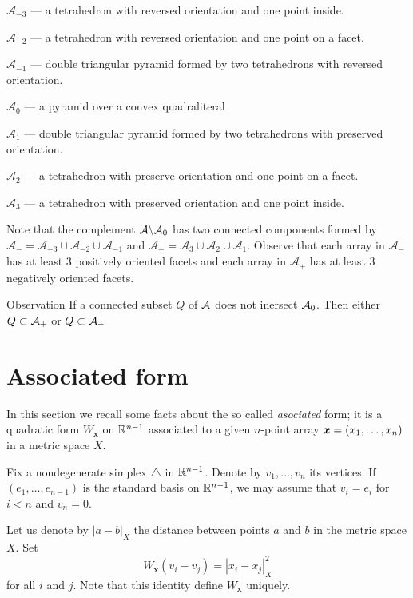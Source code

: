 \documentclass{article}
\begin{document}
$\mathcal{A}_{-3}$ --- a tetrahedron with reversed orientation and one point inside.

$\mathcal{A}_{-2}$ --- a tetrahedron with reversed orientation and one point on a facet.

$\mathcal{A}_{-1}$ --- double triangular pyramid formed by two tetrahedrons with reversed orientation.

$\mathcal{A}_{0}$ --- a pyramid over a convex quadraliteral 

$\mathcal{A}_{1}$ --- double triangular pyramid formed by two tetrahedrons with preserved orientation.

$\mathcal{A}_{2}$ --- a tetrahedron with preserve orientation and one point on a facet.

$\mathcal{A}_{3}$ --- a tetrahedron with preserved orientation and one point inside.

Note that the complement $\mathcal{A}\backslash \mathcal{A}_0$ has two connected components formed by $\mathcal{A}_{-}=\mathcal{A}_{-3}\cup \mathcal{A}_{-2}\cup\mathcal{A}_{-1}$ and $\mathcal{A}_{+}=\mathcal{A}_{3}\cup \mathcal{A}_{2}\cup\mathcal{A}_{1}$.
Observe that each array in $\mathcal{A}_{-}$ has at least 3 positively oriented facets and each array in $\mathcal{A}_{+}$ has at least 3 negatively oriented facets.

\begin{thm}{Observation}\label{obs:connectedA}
If a connected subset $Q$ of $\mathcal{A}$ does not inersect $\mathcal{A}_0$.
Then either $Q\subset \mathcal{A}_+$ or $Q\subset \mathcal{A}_-$
\end{thm}


\section{Associated form}

In this section we recall some facts \cite{petrunin-2017} about the so called \emph{asociated} form;
it is a quadratic form 
$W_{\bm{x}}$ on $\mathbb{R}^{n-1}$ associated
to a given $n$-point array $\bm{x}\z=(x_1,\dots,x_n)$ in a metric space $X$.

Fix a nondegenerate simplex $\triangle$ in $\mathbb{R}^{n-1}$.
Denote by $v_1,\dots,v_n$ its vertices.
If $(e_1,\dots,e_{n-1})$ is the standard basis on $\mathbb{R}^{n-1}$,
we may assume that $v_i=e_i$ for $i<n$ and $v_n=0$.

Let us denote by $|a-b|_X$ the distance between points $a$ and $b$ in the metric space $X$.
Set
\[W_{\bm{x}}(v_i-v_j)=|x_i-x_j|^2_X\] 
for all $i$ and $j$.
Note that this identity define $W_{\bm{x}}$ uniquely.
\end{document}
